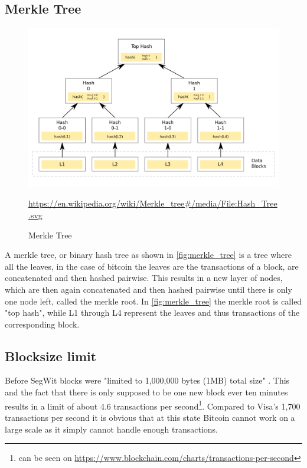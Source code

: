\subsection{Merkle Tree}
\label{sec:Basics:MerkleTree}
\begin{figure}[!ht]
    \centering
    \includegraphics[width=(\textwidth * 2 / 3 )]{Ausarbeitung/images/merkle_tree.png}
    \caption[Merkle Tree]{Merkle Tree}
    \small \url{https://en.wikipedia.org/wiki/Merkle_tree#/media/File:Hash_Tree.svg} 
    \label{fig:merkle_tree}
\end{figure}
A merkle tree, or binary hash tree as shown in \autoref{fig:merkle_tree} is a tree where all the leaves, in the case of bitcoin the leaves are the transactions of a block, are concatenated and then hashed pairwise. This results in a new layer of nodes, which are then again concatenated and then hashed pairwise until there is only one node left, called the merkle root. In \autoref{fig:merkle_tree} the merkle root is called "top hash", while L1 through L4 represent the leaves and thus transactions of the corresponding block.


\subsection{Blocksize limit}
\label{sec:Basics:BlocksizeLimit}
Before SegWit blocks were "limited to 1,000,000 bytes (1MB) total size" \cite{bip-141}. This and the fact that there is only supposed to be one new block ever ten minutes \cite{nakamoto} results in a limit of about 4.6 transactions per second\footnote{can be seen on \url{https://www.blockchain.com/charts/transactions-per-second}}\cite{hackernoon}. Compared to Visa's 1,700 transactions per second \cite{hackernoon} it is obvious that at this state Bitcoin cannot work on a large scale as it simply cannot handle enough transactions.




